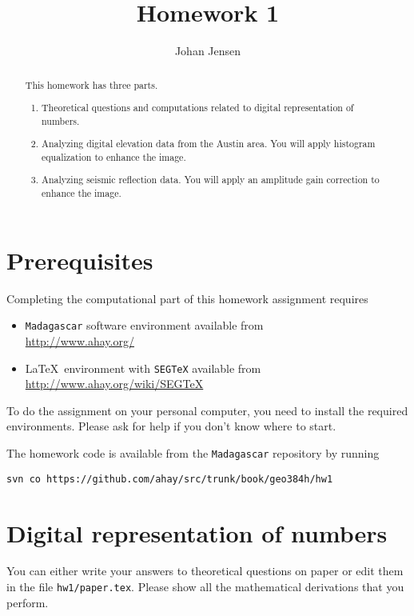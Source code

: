\author{Johan Jensen}
\title{Homework 1}

\begin{abstract}
  This homework has three parts. 
  \begin{enumerate}
  \item Theoretical questions and computations related to digital representation of numbers.
  \item Analyzing digital elevation data from the Austin area. You will apply 
  histogram equalization to enhance the image.
  \item Analyzing seismic reflection data. You will apply an amplitude gain 
  correction to enhance the image.
  \end{enumerate}
\end{abstract}

\section{Prerequisites}

Completing the computational part of this homework assignment requires
\begin{itemize}
\item \texttt{Madagascar} software environment available from \\
\url{http://www.ahay.org/}
\item \LaTeX\ environment with \texttt{SEGTeX} available from \\ 
\url{http://www.ahay.org/wiki/SEGTeX}
\end{itemize}
To do the assignment on your personal computer, you need to install
the required environments. Please ask for help if you don't know where
to start.

The homework code is available from the \texttt{Madagascar} repository
by running
\begin{verbatim}
svn co https://github.com/ahay/src/trunk/book/geo384h/hw1 
\end{verbatim}

\newpage

\section{Digital representation of numbers}

You can either write your answers to theoretical questions on paper or
edit them in the file \verb#hw1/paper.tex#. Please show all the
mathematical derivations that you perform.

